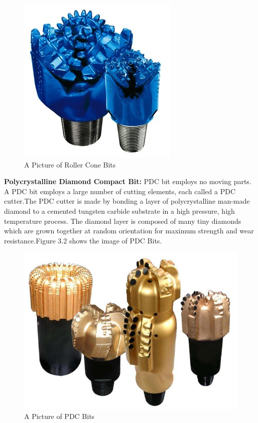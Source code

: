 \vspace{1em}

\begin{figure}[h]
\includegraphics[scale=0.3]{images/Rollerconebits}
\centering 
\caption{A Picture of Roller Cone Bits}
\end{figure}

\textbf{Polycrystalline Diamond Compact Bit:} PDC bit employs no moving parts. 
A PDC bit employs a large number of cutting elements, each called a PDC cutter.The PDC cutter is made 
by bonding a layer of polycrystalline man-made diamond to a cemented tungsten 
carbide substrate in a high pressure, high temperature process. 
The diamond layer is composed of many tiny diamonds which are grown together at random orientation for 
maximum strength and wear resistance.Figure 3.2 shows the image of PDC Bits.

\vspace{1em}

\begin{figure}[h]
\includegraphics[scale=0.3]{images/PDCbits}
\centering 
\caption{A Picture of PDC Bits}
\end{figure}

